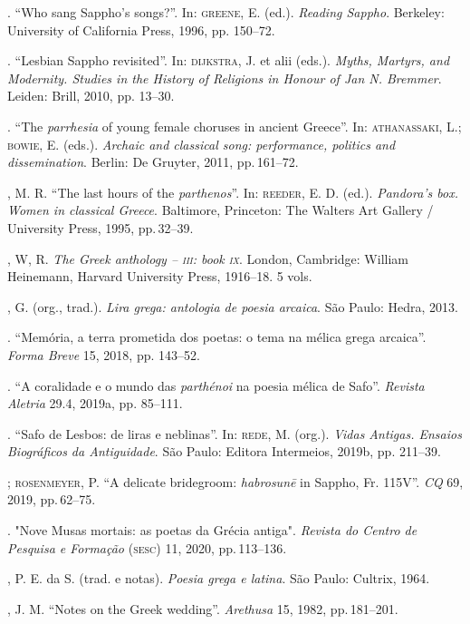 \begin{bibliohedra}
\titidem. “Who sang Sappho’s songs?”. In: \textsc{greene}, E. (ed.). \textit{Reading Sappho}. Berkeley: University of California Press, 1996, pp. 150--72.

\titidem. ``Lesbian Sappho revisited''. In: \textsc{dijkstra}, J. et alii (eds.). \textit{Myths, Martyrs, and Modernity. Studies in the History of Religions in Honour of Jan N. Bremmer}. Leiden: Brill, 2010, pp. 13--30.

\titidem. “The \textit{parrhesia} of young female choruses in ancient Greece”. In: \textsc{athanassaki}, L.; \textsc{bowie}, E. (eds.). \textit{Archaic and classical song: performance, politics and dissemination}. Berlin: De Gruyter, 2011, pp.\,161--72. 

, M. R. “The last hours of the \textit{parthenos}”. In: \textsc{reeder}, E. D. (ed.). \textit{Pandora’s box. Women in classical Greece}. Baltimore, Princeton: The Walters Art Gallery / University Press, 1995, pp.\,32--39. 

, W, R. \textit{The Greek anthology -- \textsc{iii}: book \textsc{ix}}. London, Cambridge: William Heinemann, Harvard University Press, 1916--18. 5 vols.

, G. (org., trad.). \textit{Lira grega: antologia de poesia arcaica}. São Paulo: Hedra, 2013.

\titidem. “Memória, a terra prometida dos poetas: o tema na mélica grega arcaica”. \textit{Forma Breve} 15, 2018, pp. 143--52. 

\titidem. “A coralidade e o mundo das \textit{parthénoi} na poesia mélica de Safo”. \textit{Revista Aletria} 29.4, 2019a, pp. 85--111. 

\titidem. “Safo de Lesbos: de liras e neblinas”. In: \textsc{rede}, M. (org.). \textit{Vidas Antigas. Ensaios Biográficos da Antiguidade}. São Paulo: Editora Intermeios, 2019b, pp. 211--39.

\titidem; \textsc{rosenmeyer}, P. “A delicate bridegroom: \textit{habrosunē} in Sappho, Fr. 115V”. \textit{CQ} 69, 2019, pp.\,62--75.

\titidem. "Nove Musas mortais: as poetas da Grécia antiga". \textit{Revista do Centro de Pesquisa e Formação} (\textsc{sesc}) 11, 2020, pp.\,113--136.

, P. E. da S. (trad. e notas). \textit{Poesia grega e latina}. São Paulo: Cultrix, 1964.

, J. M. “Notes on the Greek wedding”. \textit{Arethusa} 15, 1982, pp.\,181--201. 


\end{bibliohedra}
